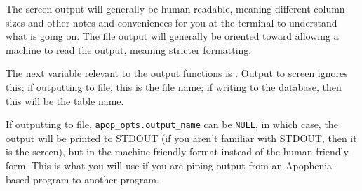 The screen output will generally be human-readable, meaning different
column sizes and other notes and conveniences for you at the terminal to
understand what is going on.
The file output will generally be oriented toward allowing a machine to
read the output, meaning stricter formatting. 

The next 
variable relevant to the output functions is . Output to screen ignores this;
if outputting to file, this is the file name; if writing to the database,
then this will be the table name. 

If outputting to file, {\tt apop\_opts.output\_name} can be
{\tt NULL}, in which case, the output will be printed to STDOUT
(if you aren't familiar with STDOUT, then it is the screen), but in the
machine-friendly format instead of the human-friendly form. This is what
you will use if you are piping output from an Apophenia-based program
to another program.

